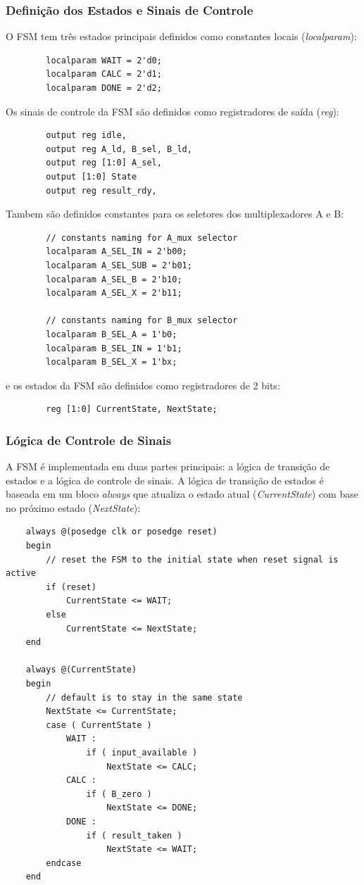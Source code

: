 \documentclass[a4paper,11pt]{article} %
\begin{document}
\subsubsection{Definição dos Estados e Sinais de Controle}
O FSM tem três estados principais definidos como constantes locais (\textit{localparam}):

\begin{verbatim}
        localparam WAIT = 2'd0;
        localparam CALC = 2'd1;
        localparam DONE = 2'd2;
\end{verbatim}

Os sinais de controle da FSM são definidos como registradores de saída (\textit{reg}):
\begin{verbatim}
        output reg idle,
        output reg A_ld, B_sel, B_ld,
        output reg [1:0] A_sel,
        output [1:0] State
        output reg result_rdy,
\end{verbatim}

Tambem são definidos constantes para os seletores dos multiplexadores A e B:
\begin{verbatim}
        // constants naming for A_mux selector
        localparam A_SEL_IN = 2'b00;
        localparam A_SEL_SUB = 2'b01;
        localparam A_SEL_B = 2'b10;
        localparam A_SEL_X = 2'b11;

        // constants naming for B_mux selector
        localparam B_SEL_A = 1'b0;
        localparam B_SEL_IN = 1'b1;
        localparam B_SEL_X = 1'bx;
\end{verbatim}

e os estados da FSM são definidos como registradores de 2 bits:
\begin{verbatim}
        reg [1:0] CurrentState, NextState;
\end{verbatim}

\subsubsection{Lógica de Controle de Sinais}
A FSM é implementada em duas partes principais: a lógica de transição de estados e a lógica de controle de sinais. A lógica de transição de estados é baseada em um bloco \textit{always} que
atualiza o estado atual (\textit{CurrentState}) com base no próximo estado (\textit{NextState}):
\begin{verbatim}
    always @(posedge clk or posedge reset)  
    begin 
        // reset the FSM to the initial state when reset signal is active
        if (reset) 
            CurrentState <= WAIT;
        else 
            CurrentState <= NextState; 
    end 

    always @(CurrentState)
    begin
        // default is to stay in the same state
        NextState <= CurrentState;
        case ( CurrentState )
            WAIT :
                if ( input_available )
                    NextState <= CALC;
            CALC :
                if ( B_zero )
                    NextState <= DONE;
            DONE :
                if ( result_taken )
                    NextState <= WAIT;
        endcase
    end
\end{verbatim}
\end{document}

